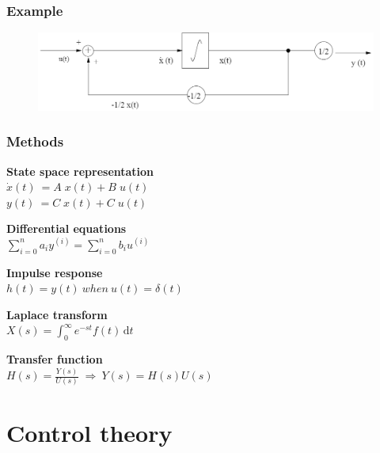 \documentclass{beamer}
\begin{document}

\begin{frame}
\frametitle{Example}
\begin{figure}
\includegraphics[width=1\linewidth]{continuous_system}
\end{figure}

\end{frame}

\begin{frame}
\frametitle{Methods}
\textbf{State space representation}\\
$\dot{x}(t) \> = A \;x(t) + B\; u(t)$ \\
$y(t)\> = C\; x(t) + C\; u(t)$
\bigskip

\textbf{Differential equations}\\
$\sum\limits_{i=0}^n a_{i}y^{(i)} = \sum \limits_{i=0}^n b_{i}u^{(i)}$
\bigskip

\textbf{Impulse response}\\
$h(t) = y(t) \> when \> u(t) = \delta(t)$\\
\bigskip

\textbf{Laplace transform}\\
$X(s) = \int_0^\infty \! e^{-st}f(t) \, \mathrm{d}t$
\bigskip

\textbf{Transfer function}\\
$H(s) = \frac{Y(s)}{U(s)} \; \Rightarrow \> Y(s) = H(s)U(s)$

\end{frame}

\section{Control theory}
\end{document}
